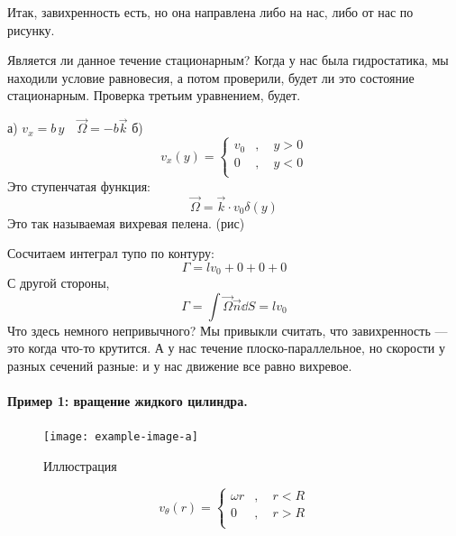 Итак, завихренность есть, но она направлена либо на нас, либо от нас по рисунку.

Является ли данное течение стационарным? Когда у нас была гидростатика, мы находили условие равновесия, а потом проверили, будет ли это состояние стационарным. Проверка третьим уравнением, будет.

а) $v_x=b\, y \quad \vec{\Omega}=-b\vec{k}$
б)
\begin{equation}
	v_x(y)=\left\{
	\begin{aligned}
		v_0&, \quad y>0\\
		0&, \quad y<0\\
	\end{aligned}
	\right.
\end{equation}
Это ступенчатая функция:
\begin{equation}
	\vec{\Omega}=\vec{k}\cdot v_0\delta(y)
\end{equation}
Это так называемая вихревая пелена. (рис)

Сосчитаем интеграл тупо по контуру:
\begin{equation}
	\Gamma=lv_0+0+0+0
\end{equation}
С другой стороны,
\begin{equation}
	\Gamma=\int \vec{\Omega}\vec{n}\dd S = lv_0
\end{equation}
Что здесь немного непривычного? Мы привыкли считать, что завихренность  --- это когда что-то крутится. А у нас течение плоско-параллельное, но скорости у разных сечений разные: и у нас движение все равно вихревое.

\paragraph{Пример 1: вращение жидкого цилиндра.} 
\begin{figure}[h!]
    \centering
    \texttt{[image: example-image-a]}
    \caption{Иллюстрация}
    \label{fig:figure1}
\end{figure}
\begin{equation}
	v_\theta(r)=\left\{
	\begin{aligned}
		\omega r&, \quad r<R\\
		0&, \quad r>R\\
	\end{aligned}
	\right.
\end{equation}

